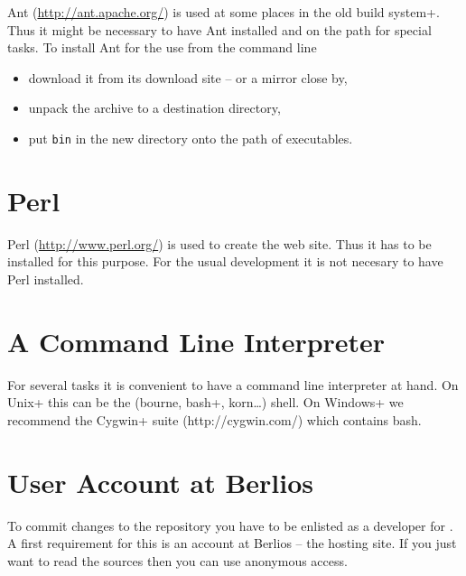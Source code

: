 Ant (\url{http://ant.apache.org/}) is used at some places in the old
\+build system+. Thus it might be necessary to have Ant installed and
on the path for special tasks. To install Ant for the use from the
command line

\begin{itemize}
\item download it from its download site -- or a mirror close by,
\item unpack the archive to a destination directory,
\item put \texttt{bin} in the new directory onto the path of
  executables.
\end{itemize}


\section{Perl}

Perl (\url{http://www.perl.org/}) is used to create the web site. Thus
it has to be installed for this purpose. For the usual development it
is not necesary to have Perl installed. 


\section{A Command Line Interpreter}

For several tasks it is convenient to have a command line interpreter
at hand. On \+Unix+ this can be the (bourne,
\+bash+, korn\ldots) shell. On \+Windows+ we
recommend the \+Cygwin+ suite (http://cygwin.com/) which contains
bash.  


\section{User Account at Berlios}

To commit changes to the repository you have to be enlisted as a
developer for \ExTeX. A first requirement for this is an account at
Berlios -- the hosting site. If you just want to read the sources then
you can use anonymous access.

